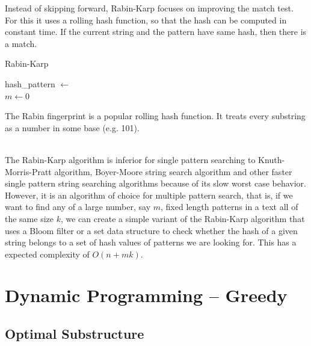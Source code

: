 \documentclass[a4paper, 12pt]{article}
\begin{document}
Instead of skipping forward, Rabin-Karp focuses on improving the match test. For this it uses a rolling hash function, so that the hash can be computed in constant time. If the current string and the pattern have same hash, then there is a match.

\vspace{0.5cm}
\IncMargin{2em}
\begin{algorithm}[H]
\caption{Rabin-Karp}
\vspace{0.1cm}
\Indm
\Indp
\vspace{0.1cm}
hash\_pattern $\gets$ \\
$m \gets 0$\\
\end{algorithm}
\DecMargin{2em}
\vspace{0.5cm}

The Rabin fingerprint is a popular rolling hash function. It treats every substring as a number in some base (e.g. 101).

~\\
The Rabin-Karp algorithm is inferior for single pattern searching to Knuth-Morris-Pratt algorithm, Boyer-Moore string search algorithm and other faster single pattern string searching algorithms because of its slow worst case behavior. However, it is an algorithm of choice for multiple pattern search, that is, if we want to find any of a large number, say $m$, fixed length patterns in a text all of the same size $k$, we can create a simple variant of the Rabin-Karp algorithm that uses a Bloom filter or a set data structure to check whether the hash of a given string belongs to a set of hash values of patterns we are looking for. This has a expected complexity of $O(n + mk)$.

\section{Dynamic Programming -- Greedy}

  \subsection{Optimal Substructure}
\end{document}
